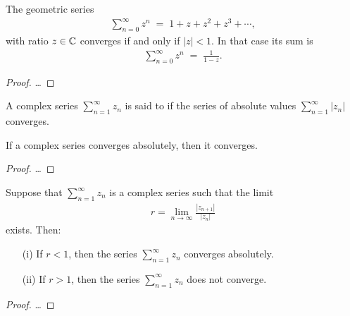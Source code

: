 \begin{lemma}
  \label{lem:geometric_series}
  The geometric series
  \begin{align*}
    \sum_{n=0}^\infty z^n \; = \; 1 + z + z^2 + z^3 + \cdots ,
  \end{align*}
  with ratio $z \in \mathbb{C}$ converges if and only if
  $|z| < 1$. In that case its sum is
  \begin{align*}
    \sum_{n=0}^\infty z^n \; = \; \frac{1}{1-z} .
  \end{align*}
\end{lemma}
\begin{proof}
  \ldots
\end{proof}

\begin{definition}
  \label{def:absolute_convergence}
  A complex series $\sum_{n=1}^\infty z_n$ is said to
   if the series of absolute values
  $\sum_{n=1}^\infty |z_n|$ converges.
\end{definition}

\begin{lemma}
  \label{lem:absolute_convergence_implies_convergence}
  If a complex series %
  converges absolutely, then it converges.
\end{lemma}
\begin{proof}
  \ldots
\end{proof}

\begin{lemma}
  \label{lem:ratio_test}
  Suppose that $\sum_{n=1}^\infty z_n$ is a complex
  series such that the limit
  \begin{align*}
    r = \lim_{n \to \infty} \frac{|z_{n+1}|}{|z_n|}
  \end{align*}
  exists. Then:
  \begin{itemize}
    \item[(i)] If $r < 1$, then the series $\sum_{n=1}^\infty z_n$ converges absolutely.
    \item[(ii)] If $r > 1$, then the series $\sum_{n=1}^\infty z_n$ does not converge.
  \end{itemize}
\end{lemma}
\begin{proof}
  \ldots
\end{proof}



